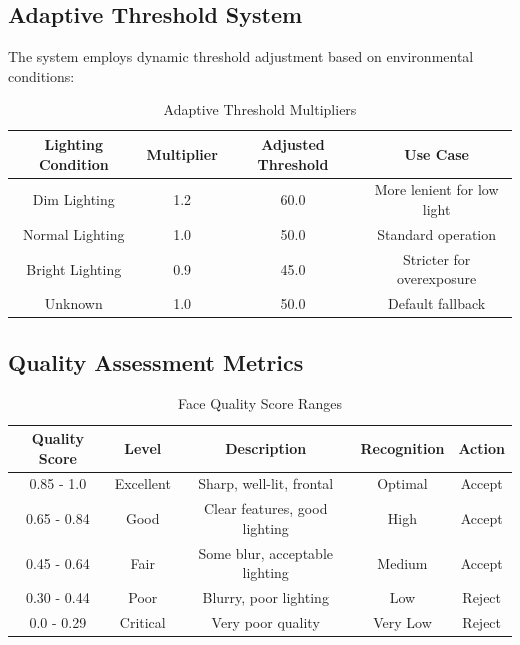 \documentclass[12pt,a4paper]{article}
\begin{document}
\subsection{Adaptive Threshold System}

The system employs dynamic threshold adjustment based on environmental conditions:

\begin{table}[h!]
\centering
\caption{Adaptive Threshold Multipliers}
\begin{tabular}{|c|c|c|c|}
\hline
\textbf{Lighting Condition} & \textbf{Multiplier} & \textbf{Adjusted Threshold} & \textbf{Use Case} \\
\hline
Dim Lighting & 1.2 & 60.0 & More lenient for low light \\
\hline
Normal Lighting & 1.0 & 50.0 & Standard operation \\
\hline
Bright Lighting & 0.9 & 45.0 & Stricter for overexposure \\
\hline
Unknown & 1.0 & 50.0 & Default fallback \\
\hline
\end{tabular}
\end{table}

\subsection{Quality Assessment Metrics}

\begin{table}[h!]
\centering
\caption{Face Quality Score Ranges}
\begin{tabular}{|c|c|c|c|c|}
\hline
\textbf{Quality Score} & \textbf{Level} & \textbf{Description} & \textbf{Recognition} & \textbf{Action} \\
\hline
0.85 - 1.0 & \textcolor{excellent}{Excellent} & Sharp, well-lit, frontal & Optimal & Accept \\
\hline
0.65 - 0.84 & \textcolor{good}{Good} & Clear features, good lighting & High & Accept \\
\hline
0.45 - 0.64 & \textcolor{fair}{Fair} & Some blur, acceptable lighting & Medium & Accept \\
\hline
0.30 - 0.44 & \textcolor{poor}{Poor} & Blurry, poor lighting & Low & Reject \\
\hline
0.0 - 0.29 & \textcolor{critical}{Critical} & Very poor quality & Very Low & Reject \\
\hline
\end{tabular}
\end{table}
\end{document}
